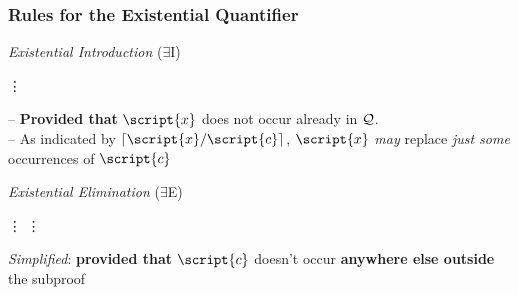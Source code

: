 \begin{frame}
\frametitle{Rules for the Existential Quantifier}
\footnotesize


\begin{multicols}{2}
\begin{center}
\textit{Existential Introduction} ($\exists$I) \vspace{-0.5em}
\begin{fitchproof}
	 {\hspace{2em} \vdots}
 
\end{fitchproof}
    \end{center}
 -- \textbf{Provided that} $\script{x}$ does not occur already in $\mathcal{Q}$. \\[1em] -- As indicated by $\substitutesome{\script{c}}{\script{x}}$, $\script{x}$ \emph{may} replace \emph{just some} occurrences of $\script{c}$
 \vspace{5em}
\columnbreak

\begin{center}
\textit{Existential Elimination} ($\exists$E) \vspace{-1em}
\begin{fitchproof}
	 {\hspace{2em} \vdots}
	\open	
		 
		 {\hspace{2em} \vdots}
	\close
	 
\end{fitchproof}
    \end{center}
    \textit{Simplified}: \textbf{provided that} $\script{c}$ doesn't occur \textbf{anywhere else outside} the subproof
     \vspace{1em}
\end{multicols} 
\end{frame}

